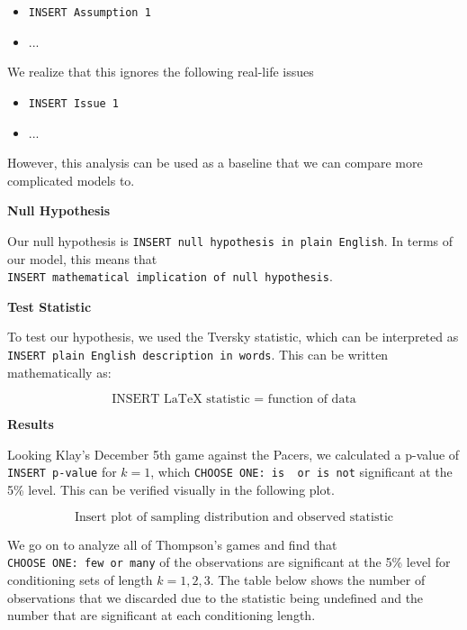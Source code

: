 \documentclass[11pt]{article}
\providecommand{\tightlist}{%
      \setlength{\itemsep}{0pt}\setlength{\parskip}{0pt}}
\begin{document}
\begin{itemize}
\tightlist
\item
  \texttt{INSERT\ Assumption\ 1}
\item
  ...
\end{itemize}

We realize that this ignores the following real-life issues

\begin{itemize}
\tightlist
\item
  \texttt{INSERT\ Issue\ 1}
\item
  ...
\end{itemize}

However, this analysis can be used as a baseline that we can compare
more complicated models to.

\textbf{Null Hypothesis}

Our null hypothesis is
\texttt{INSERT\ null\ hypothesis\ in\ plain\ English}. In terms of our
model, this means that
\texttt{INSERT\ mathematical\ implication\ of\ null\ hypothesis}.

\textbf{Test Statistic}

To test our hypothesis, we used the Tversky statistic, which can be
interpreted as \texttt{INSERT\ plain\ English\ description\ in\ words}.
This can be written mathematically as:

\[\text{INSERT LaTeX statistic = function of data}\]

\textbf{Results}

Looking Klay's December 5th game against the Pacers, we calculated a
p-value of \texttt{INSERT\ p-value} for \(k=1\), which
\texttt{CHOOSE\ ONE:\ is\ \ or\ is\ not} significant at the 5\% level.
This can be verified visually in the following plot.

\[\text{Insert plot of sampling distribution and observed statistic}\]

We go on to analyze all of Thompson's games and find that
\texttt{CHOOSE\ ONE:\ few\ or\ many} of the observations are significant
at the 5\% level for conditioning sets of length \(k=1,2,3\). The table
below shows the number of observations that we discarded due to the
statistic being undefined and the number that are significant at each
conditioning length.
\end{document}
